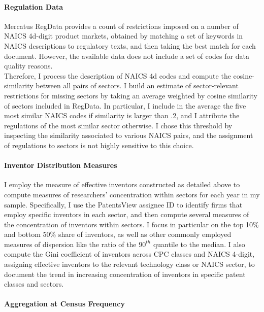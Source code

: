\paragraph{Regulation Data}

Mercatus RegData provides a count of restrictions imposed on a number
of NAICS 4d-digit product markets, obtained by matching a set of keywords
in NAICS descriptions to regulatory texts, and then taking the best
match for each document. However, the available data does not include
a set of codes for data quality reasons. \\
Therefore, I process the description of NAICS 4d codes and compute
the cosine-similarity between all pairs of sectors. I build an estimate
of sector-relevant restrictions for missing sectors by taking an average
weighted by cosine similarity of sectors included in RegData. In particular,
I include in the average the five most similar NAICS codes if similarity
is larger than .2, and I attribute the regulations of the most similar
sector otherwise. I chose this threshold by inspecting the similarity
associated to various NAICS pairs, and the assignment of regulations
to sectors is not highly sensitive to this choice.

\paragraph{Inventor Distribution Measures}

I employ the measure of effective inventors constructed as detailed
above to compute measures of researchers' concentration within sectors
for each year in my sample. Specifically, I use the PatentsView assignee
ID to identify firms that employ specific inventors in each sector,
and then compute several measures of the concentration of inventors
within sectors. I focus in particular on the top 10\% and bottom 50\%
share of inventors, as well as other commonly employed measures of
dispersion like the ratio of the $90^{th}$ quantile to the median.
I also compute the Gini coefficient of inventors across CPC classes
and NAICS 4-digit, assigning effective inventors to the relevant technology
class or NAICS sector, to document the trend in increasing concentration
of inventors in specific patent classes and sectors.

\paragraph{Aggregation at Census Frequency}

